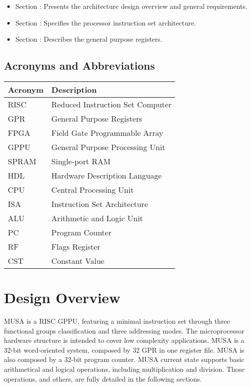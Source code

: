 \documentclass{article}
\begin{document}
	\begin{itemize}
	  \item Section \color{black}{\ref{sec:design_overview}}: Presents the architecture design overview and general requirements. 
	  \item Section \color{black}{\ref{sec:isa}}: Specifies the processor instruction set architecture.
	  \item Section \color{black}{\ref{sec:register}}: Describes the general purpose registers.
	\end{itemize}
		
  \subsection{Acronyms and Abbreviations}
  
  \FloatBarrier
  \begin{table}[H]
    \begin{center}
      \begin{tabular}[pos]{|m{2cm} | m{9cm}|} 
	\hline
	\cellcolor[gray]{0.9}\textbf{Acronym} & \cellcolor[gray]{0.9}\textbf{Description} \\ \hline
	    RISC   & Reduced Instruction Set Computer \\ \hline
	    GPR    & General Purpose Registers \\ \hline
	    FPGA   & Field Gate Programmable Array \\ \hline
	    GPPU   & General Purpose Processing Unit \\ \hline
	    SPRAM  & Single-port RAM \\ \hline	    
	    HDL    & Hardware Description Language \\ \hline
	    CPU    & Central Processing Unit \\ \hline
	    ISA    & Instruction Set Architecture \\ \hline
	    ALU    & Arithmetic and Logic Unit \\ \hline
	    PC     & Program Counter \\ \hline
	    RF     & Flags Register \\ \hline
	    CST    & Constant Value \\ \hline
      \end{tabular}
    \end{center}
  \end{table}
  
  \newpage
  \section{Design Overview}
  \label{sec:design_overview}
  MUSA is a RISC GPPU, featuring a minimal instruction set through three functional groups classification and three addressing modes. The microprocessor hardware structure is intended to cover low complexity applications. MUSA is a 32-bit word-oriented system, composed by 32 GPR in one register file. MUSA is also composed by a 32-bit program counter. MUSA current state supports basic arithmetical and logical operations, including multiplication and division. Those operations, and others, are fully detailed in the following sections. 
  
\end{document}
